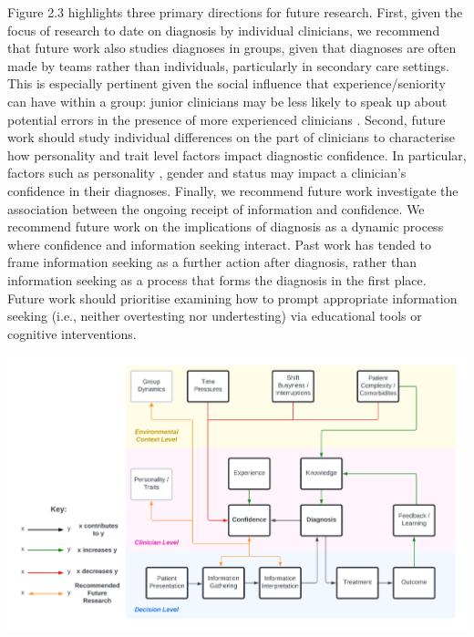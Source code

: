 \documentclass[a4paper, nobind]{templates/ociamthesis}
\begin{document}
Figure 2.3 highlights three primary directions for future research. First, given the focus of research to date on diagnosis by individual clinicians, we recommend that future work also studies diagnoses in groups, given that diagnoses are often made by teams rather than individuals, particularly in secondary care settings. This is especially pertinent given the social influence that experience/seniority can have within a group: junior clinicians may be less likely to speak up about potential errors in the presence of more experienced clinicians \autocite{hemon_speaking_2020}. Second, future work should study individual differences on the part of clinicians to characterise how personality and trait level factors impact diagnostic confidence. In particular, factors such as personality \autocite{schaefer_overconfidence_2004}, gender \autocite{syzmanowicz_gender_2011} and status \autocite{see_detrimental_2011} may impact a clinician's confidence in their diagnoses. Finally, we recommend future work investigate the association between the ongoing receipt of information and confidence. We recommend future work on the implications of diagnosis as a dynamic process where confidence and information seeking interact. Past work has tended to frame information seeking as a further action after diagnosis, rather than information seeking as a process that forms the diagnosis in the first place. Future work should prioritise examining how to prompt appropriate information seeking (i.e., neither overtesting nor undertesting) via educational tools or cognitive interventions.

\begin{center}\includegraphics[width=1\linewidth]{./assets/ReviewModel} \end{center}
\end{document}
